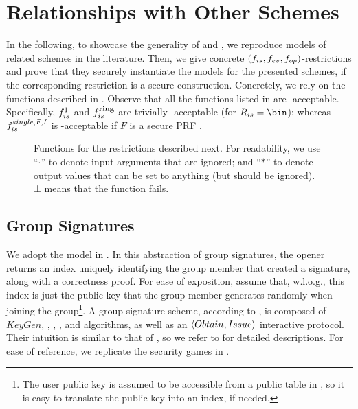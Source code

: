 \section{Relationships with Other Schemes}
\label{sec:relationships}


In the following, to showcase the generality of \UAS and \CUASGen, we reproduce
models of related schemes in the literature.
Then, we give concrete $(f_{is},f_{ev},f_{op})$-\CUASGen restrictions and prove
that they securely instantiate the models for the presented schemes, if the
corresponding \CUASGen restriction is a secure \UAS construction. Concretely,
we rely on the functions described in . Observe
that all the \fissue functions listed in  are
\UAS-acceptable. Specifically, $f_{is}^1$ and $f_{is}^{\mathbf{ring}}$ are trivially
\UAS-acceptable (for $\rngfissue = \bin$); whereas $f_{is}^{single,F,I}$ is
\UAS-acceptable if $F$ is a secure PRF \cite{kl14}.

\begin{figure}[ht!]
  
  \caption{Functions for the \CUASGen restrictions described next.
    For readability, we use ``$\cdot$'' to denote input arguments that are
    ignored; and ``$\ast$'' to denote output values that can be set to anything
    (but should be ignored). $\bot$ means that the function fails.}
  \label{fig:func-restrictions}
\end{figure}

\subsection{Group Signatures}
\label{ssec:related-models-gs}

We adopt the model in \cite{bsz05}. In this abstraction of group signatures, the
opener returns an index uniquely identifying the group member that created a
signature, along with a correctness proof. For ease of exposition, assume that,
w.l.o.g., this index is just the public key that the group member generates
randomly when joining the group\footnote{The user public key is assumed to be
  accessible from a public table in \cite{bsz05}, so it is easy to translate the
  public key into an index, if needed.}. A group signature scheme, according to
\cite{bsz05}, is composed of $KeyGen$, \UKeyGen, \Sign, \Verify, \Open and
\Judge algorithms, as well as an $\langle Obtain,Issue\rangle$ interactive
protocol. Their intuition is similar to that of \UAS, so we refer to
\cite{bsz05} for detailed descriptions. For ease of reference, we replicate the
security games in .


